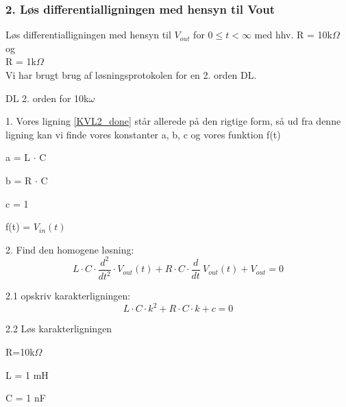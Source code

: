 \subsubsection*{2. Løs differentialligningen med hensyn til Vout }
 Løs differentialligningen med hensyn til $V_{out}$ for $ 0\leq t<\infty$ med hhv. R = 10k$\Omega$ og \\ R = 1k$\Omega$ \\

Vi har brugt brug af løsningsprotokolen for en 2. orden DL.

DL 2. orden for 10k$\omega$

1. Vores ligning \ref{KVL2_done} står allerede på den rigtige form, så ud fra denne ligning kan vi finde vores konstanter a, b, c og vores funktion f(t)

\begin{center}
\begin{minipage}{.2\linewidth}
a = L $\cdot$ C
\end{minipage}
\begin{minipage}{.2\linewidth}
b = R $\cdot$ C
\end{minipage}
\begin{minipage}{.2\linewidth}
c = 1
\end{minipage}
\begin{minipage}{.2\linewidth}
f(t) = $V_{in}(t)$
\end{minipage}
\end{center}

2. Find den homogene løsning: 
\begin{equation}
	L\cdot C\cdot \dfrac{d^{2}}{dt^{2}}\cdot V_{out}  \left(t\right) +R\cdot C\cdot \dfrac{d}{dt}\ V_{out}  \left(t\right) +V_{out} = 0
\end{equation}

2.1 opskriv karakterligningen:
\begin{equation}
	L\cdot C\cdot k^{2}+R\cdot C\cdot k+c = 0
\end{equation}

2.2 Løs karakterligningen

\begin{center}
\begin{minipage}{.2\linewidth}
R=10k$\Omega$
\end{minipage}
\begin{minipage}{.2\linewidth}
L = 1 mH
\end{minipage}
\begin{minipage}{.2\linewidth}
C = 1 nF
\end{minipage}
\end{center}


